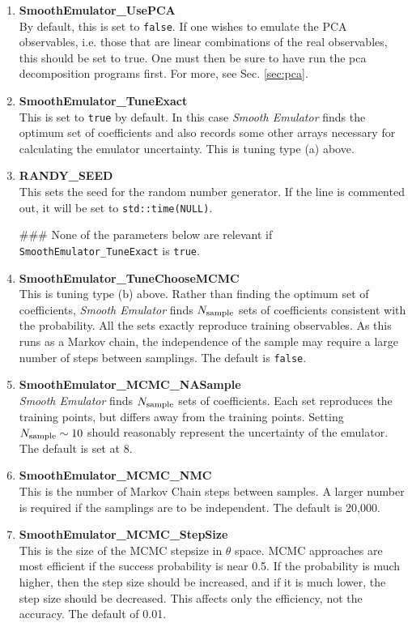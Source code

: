 \documentclass[UserManual.tex]{subfiles}
\begin{document}
\begin{enumerate}
\item {\bf SmoothEmulator\_UsePCA}\\
By default, this is set to {\tt false}. If one wishes to emulate the PCA observables, i.e. those that are linear combinations of the real observables, this should be set to true. One must then be sure to have run the pca decomposition programs first. For more, see Sec. \ref{sec:pca}. 

\item {\bf SmoothEmulator\_TuneExact}\\
This is set to {\tt true} by default. In this case {\it Smooth Emulator} finds the optimum set of coefficients and also records some other arrays necessary for calculating the emulator uncertainty. This is tuning type (a) above.

\item {\bf RANDY\_SEED}\\
This sets the seed for the random number generator. If the line is commented out, it will be set to {\tt std::time(NULL)}.

\#\#\# None of the parameters below are relevant if {\tt SmoothEmulator\_TuneExact} is {\tt true}.

\item {\bf SmoothEmulator\_TuneChooseMCMC}\\
This is tuning type (b) above. Rather than finding the optimum set of coefficients, {\it Smooth Emulator} finds $N_{\rm sample}$ sets of coefficients consistent with the probability. All the sets exactly reproduce training observables. As this runs as a Markov chain, the independence of the sample may require a large number of steps between samplings. The default is {\tt false}.

\item {\bf SmoothEmulator\_MCMC\_NASample}\\
{\it Smooth Emulator} finds $N_{\rm sample}$ sets of coefficients. Each set reproduces the training points, but differs away from the training points. Setting $N_{\rm sample}\sim 10$ should reasonably represent the uncertainty of the emulator. The default is set at 8.

\item {\bf SmoothEmulator\_MCMC\_NMC}\\
This is the number of Markov Chain steps between samples. A larger number is required if the samplings are to be independent. The default is 20,000.

\item {\bf SmoothEmulator\_MCMC\_StepSize}\\
This is the size of the MCMC stepsize in $\theta$ space. MCMC approaches are most efficient if the success probability is near 0.5. If the probability is much higher, then the step size should be increased, and if it is much lower, the step size should be decreased. This affects only the efficiency, not the accuracy. The default of 0.01.


\end{enumerate}
\end{document}
